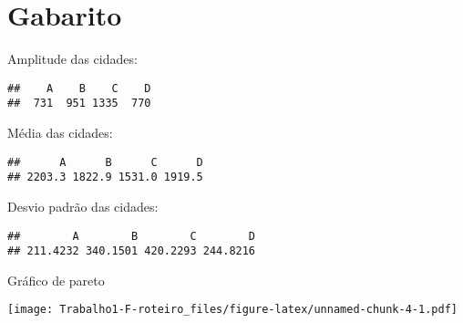 \documentclass[]{article}
\begin{document}
\section{Gabarito}\label{gabarito}

Amplitude das cidades:

\begin{verbatim}
##    A    B    C    D 
##  731  951 1335  770
\end{verbatim}

Média das cidades:

\begin{verbatim}
##      A      B      C      D 
## 2203.3 1822.9 1531.0 1919.5
\end{verbatim}

Desvio padrão das cidades:

\begin{verbatim}
##        A        B        C        D 
## 211.4232 340.1501 420.2293 244.8216
\end{verbatim}

Gráfico de pareto

\texttt{[image: Trabalho1-F-roteiro\_files/figure-latex/unnamed-chunk-4-1.pdf]}\\
\end{document}

